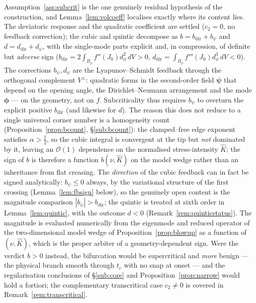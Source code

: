 \begin{remark}
    \label{rem:bsign}
    Assumption~\ref{ass:subcrit} is the one genuinely residual hypothesis of the construction, and
    Lemma~\ref{lem:volcoeff} localises exactly where its content lies. The deviatoric response and the quadratic
    coefficient are settled ($c_2=0$, no feedback correction); the cubic and quintic decompose as
    $b=b_{\mathrm{dir}}+b_\psi$ and $d=d_{\mathrm{dir}}+d_\psi$, with the single-mode parts explicit and, in
    compression, of definite but \emph{adverse} sign ($b_{\mathrm{dir}}=2\!\int_{B_\rho} f''(J_0)d_\phi^2\,dV>0$,
    $d_{\mathrm{dir}}=\!\int_{B_\rho} f'''(J_0)d_\phi^3\,dV<0$). The corrections $b_\psi,d_\psi$ are the
    Lyapunov--Schmidt feedback through the orthogonal complement $V^\perp$: quadratic forms in the second-order field
    $\bm\psi$ that depend on the opening angle, the Dirichlet--Neumann arrangement and the mode $\bm\phi$ --- on the
    geometry, not on $f$. Subcriticality thus requires $b_\psi$ to overturn the explicit positive $b_{\mathrm{dir}}$
    (and likewise for $d$). The reason this does not reduce to a single universal corner number is a homogeneity count
    (Proposition~\ref{prop:bcount}, \S\ref{sub:bcount}): the clamped--free edge exponent satisfies $\alpha>\tfrac12$, so
    the cubic integral is convergent at the tip but \emph{not} dominated by it, leaving an $\mathcal{O}(1)$ dependence on
    the normalised stress-intensity $\hat K$; the sign of $b$ is therefore a function $b(\nu,\hat K)$ on the model wedge
    rather than an inheritance from flat creasing. The \emph{direction} of the cubic feedback can in fact be signed
    analytically: $b_\psi\le0$ always, by the variational structure of the first crossing
    (Lemma~\ref{lem:fbsign} below), so the genuinely open content is the magnitude comparison
    $|b_\psi|>b_{\mathrm{dir}}$; the quintic is treated at sixth order in Lemma~\ref{lem:quintic}, with the outcome
    $d<0$ (Remark~\ref{rem:quinticstatus}). The magnitude is evaluated
    numerically from the eigenmode and reduced operator of the two-dimensional model wedge of Proposition~\ref{prop:blowup}
    as a function of $(\nu,\hat K)$, which is the proper arbiter of a geometry-dependent sign. Were the verdict $b>0$ instead, the bifurcation would be supercritical and \emph{more}
    benign --- the physical branch smooth through $t_c$ with no snap at onset --- and the regularisation conclusions of
    \S\ref{sub:core} and Proposition~\ref{prop:narrow} would hold a fortiori; the complementary transcritical case
    $c_2\neq0$ is covered in Remark~\ref{rem:transcritical}.
\end{remark}

